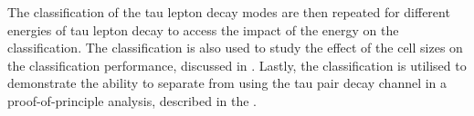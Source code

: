 The classification of the tau lepton decay modes are then  repeated for different energies of tau lepton decay to access the impact of the energy on the classification. The classification is also used to study the effect of the \ECAL cell sizes on the classification performance,  discussed in . Lastly, the classification is utilised to demonstrate the ability to separate \PHiggs from \PZ using the tau pair decay channel in a proof-of-principle analysis, described in the .







